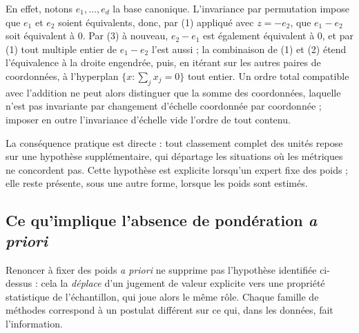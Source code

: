 \documentclass[11pt,a4paper]{article}
\theoremstyle{definition}
\theoremstyle{remark}
\begin{document}
\bigskip

En effet, notons $e_1,\dots,e_d$ la base canonique. L'invariance par permutation impose
que $e_1$ et $e_2$ soient équivalents, donc, par (1) appliqué avec $z = -e_2$, que
$e_1 - e_2$ soit équivalent à $0$. Par (3) à nouveau, $e_2 - e_1$ est également équivalent
à $0$, et par (1) tout multiple entier de $e_1 - e_2$ l'est aussi ; la combinaison de (1)
et (2) étend l'équivalence à la droite engendrée, puis, en itérant sur les autres paires
de coordonnées, à l'hyperplan $\{x : \sum_j x_j = 0\}$ tout entier. Un ordre total
compatible avec l'addition ne peut alors distinguer que la somme des coordonnées, laquelle
n'est pas invariante par changement d'échelle coordonnée par coordonnée ; imposer en outre
l'invariance d'échelle vide l'ordre de tout contenu.

\bigskip

La conséquence pratique est directe : tout classement complet des unités repose sur une
hypothèse supplémentaire, qui départage les situations où les métriques ne concordent pas.
Cette hypothèse est explicite lorsqu'un expert fixe des poids ; elle reste présente, sous
une autre forme, lorsque les poids sont estimés.

\bigskip

\subsection{Ce qu'implique l'absence de pondération \emph{a priori}}

\medskip

Renoncer à fixer des poids \emph{a priori} ne supprime pas l'hypothèse identifiée
ci-dessus : cela la \emph{déplace} d'un jugement de valeur explicite vers une propriété
statistique de l'échantillon, qui joue alors le même rôle. Chaque famille de méthodes
correspond à un postulat différent sur ce qui, dans les données, fait l'information.

\medskip
\end{document}
